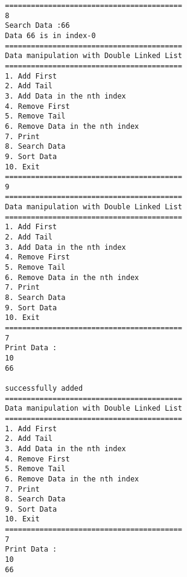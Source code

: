 \documentclass[12pt,titlepage]{article}
\begin{document}
\begin{enumerate}
\begin{verbatim}
        =========================================
        8
        Search Data :66
        Data 66 is in index-0
        =========================================
        Data manipulation with Double Linked List
        =========================================
        1. Add First
        2. Add Tail
        3. Add Data in the nth index
        4. Remove First
        5. Remove Tail
        6. Remove Data in the nth index
        7. Print
        8. Search Data
        9. Sort Data
        10. Exit
        =========================================
        9
        =========================================
        Data manipulation with Double Linked List
        =========================================
        1. Add First
        2. Add Tail
        3. Add Data in the nth index
        4. Remove First
        5. Remove Tail
        6. Remove Data in the nth index
        7. Print
        8. Search Data
        9. Sort Data
        10. Exit
        =========================================
        7
        Print Data :
        10
        66

        successfully added
        =========================================
        Data manipulation with Double Linked List
        =========================================
        1. Add First
        2. Add Tail
        3. Add Data in the nth index
        4. Remove First
        5. Remove Tail
        6. Remove Data in the nth index
        7. Print
        8. Search Data
        9. Sort Data
        10. Exit
        =========================================
        7  
        Print Data :
        10
        66


\end{verbatim}
\end{enumerate}
\end{document}
